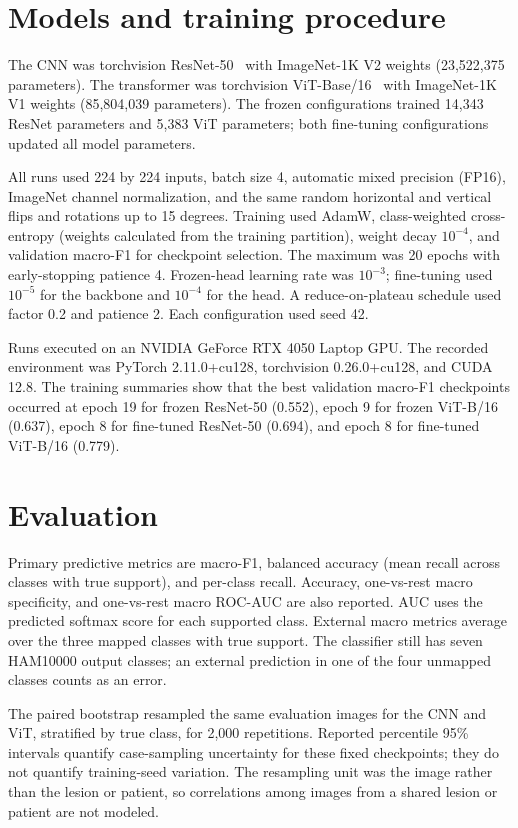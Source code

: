 \documentclass[11pt]{article}
\begin{document}
\section{Models and training procedure}

The CNN was torchvision ResNet-50~\cite{he2016} with ImageNet-1K V2 weights (23,522,375 parameters). The transformer was torchvision ViT-Base/16~\cite{dosovitskiy2021} with ImageNet-1K V1 weights (85,804,039 parameters). The frozen configurations trained 14,343 ResNet parameters and 5,383 ViT parameters; both fine-tuning configurations updated all model parameters.

All runs used 224 by 224 inputs, batch size 4, automatic mixed precision (FP16), ImageNet channel normalization, and the same random horizontal and vertical flips and rotations up to 15 degrees. Training used AdamW, class-weighted cross-entropy (weights calculated from the training partition), weight decay $10^{-4}$, and validation macro-F1 for checkpoint selection. The maximum was 20 epochs with early-stopping patience 4. Frozen-head learning rate was $10^{-3}$; fine-tuning used $10^{-5}$ for the backbone and $10^{-4}$ for the head. A reduce-on-plateau schedule used factor 0.2 and patience 2. Each configuration used seed 42.

Runs executed on an NVIDIA GeForce RTX 4050 Laptop GPU. The recorded environment was PyTorch 2.11.0+cu128, torchvision 0.26.0+cu128, and CUDA 12.8. The training summaries show that the best validation macro-F1 checkpoints occurred at epoch 19 for frozen ResNet-50 (0.552), epoch 9 for frozen ViT-B/16 (0.637), epoch 8 for fine-tuned ResNet-50 (0.694), and epoch 8 for fine-tuned ViT-B/16 (0.779).

\section{Evaluation}

Primary predictive metrics are macro-F1, balanced accuracy (mean recall across classes with true support), and per-class recall. Accuracy, one-vs-rest macro specificity, and one-vs-rest macro ROC-AUC are also reported. AUC uses the predicted softmax score for each supported class. External macro metrics average over the three mapped classes with true support. The classifier still has seven HAM10000 output classes; an external prediction in one of the four unmapped classes counts as an error.

The paired bootstrap resampled the same evaluation images for the CNN and ViT, stratified by true class, for 2,000 repetitions. Reported percentile 95\% intervals quantify case-sampling uncertainty for these fixed checkpoints; they do not quantify training-seed variation. The resampling unit was the image rather than the lesion or patient, so correlations among images from a shared lesion or patient are not modeled.
\end{document}
